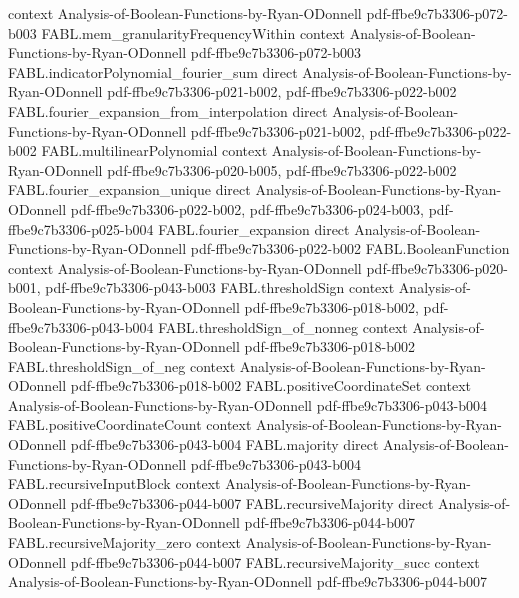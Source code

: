\begin{theorem}
  {context}
  {Analysis-of-Boolean-Functions-by-Ryan-ODonnell}
  {pdf-ffbe9c7b3306-p072-b003}
\proofstep
  {FABL.mem_granularityFrequencyWithin}
  {context}
  {Analysis-of-Boolean-Functions-by-Ryan-ODonnell}
  {pdf-ffbe9c7b3306-p072-b003}
\proofstep
  {FABL.indicatorPolynomial_fourier_sum}
  {direct}
  {Analysis-of-Boolean-Functions-by-Ryan-ODonnell}
  {pdf-ffbe9c7b3306-p021-b002,
    pdf-ffbe9c7b3306-p022-b002}
\proofstep
  {FABL.fourier_expansion_from_interpolation}
  {direct}
  {Analysis-of-Boolean-Functions-by-Ryan-ODonnell}
  {pdf-ffbe9c7b3306-p021-b002,
    pdf-ffbe9c7b3306-p022-b002}
\proofstep
  {FABL.multilinearPolynomial}
  {context}
  {Analysis-of-Boolean-Functions-by-Ryan-ODonnell}
  {pdf-ffbe9c7b3306-p020-b005,
    pdf-ffbe9c7b3306-p022-b002}
\proofstep
  {FABL.fourier_expansion_unique}
  {direct}
  {Analysis-of-Boolean-Functions-by-Ryan-ODonnell}
  {pdf-ffbe9c7b3306-p022-b002,
    pdf-ffbe9c7b3306-p024-b003,
    pdf-ffbe9c7b3306-p025-b004}
\proofstep
  {FABL.fourier_expansion}
  {direct}
  {Analysis-of-Boolean-Functions-by-Ryan-ODonnell}
  {pdf-ffbe9c7b3306-p022-b002}
\proofstep
  {FABL.BooleanFunction}
  {context}
  {Analysis-of-Boolean-Functions-by-Ryan-ODonnell}
  {pdf-ffbe9c7b3306-p020-b001,
    pdf-ffbe9c7b3306-p043-b003}
\proofstep
  {FABL.thresholdSign}
  {context}
  {Analysis-of-Boolean-Functions-by-Ryan-ODonnell}
  {pdf-ffbe9c7b3306-p018-b002,
    pdf-ffbe9c7b3306-p043-b004}
\proofstep
  {FABL.thresholdSign_of_nonneg}
  {context}
  {Analysis-of-Boolean-Functions-by-Ryan-ODonnell}
  {pdf-ffbe9c7b3306-p018-b002}
\proofstep
  {FABL.thresholdSign_of_neg}
  {context}
  {Analysis-of-Boolean-Functions-by-Ryan-ODonnell}
  {pdf-ffbe9c7b3306-p018-b002}
\proofstep
  {FABL.positiveCoordinateSet}
  {context}
  {Analysis-of-Boolean-Functions-by-Ryan-ODonnell}
  {pdf-ffbe9c7b3306-p043-b004}
\proofstep
  {FABL.positiveCoordinateCount}
  {context}
  {Analysis-of-Boolean-Functions-by-Ryan-ODonnell}
  {pdf-ffbe9c7b3306-p043-b004}
\proofstep
  {FABL.majority}
  {direct}
  {Analysis-of-Boolean-Functions-by-Ryan-ODonnell}
  {pdf-ffbe9c7b3306-p043-b004}
\proofstep
  {FABL.recursiveInputBlock}
  {context}
  {Analysis-of-Boolean-Functions-by-Ryan-ODonnell}
  {pdf-ffbe9c7b3306-p044-b007}
\proofstep
  {FABL.recursiveMajority}
  {direct}
  {Analysis-of-Boolean-Functions-by-Ryan-ODonnell}
  {pdf-ffbe9c7b3306-p044-b007}
\proofstep
  {FABL.recursiveMajority_zero}
  {context}
  {Analysis-of-Boolean-Functions-by-Ryan-ODonnell}
  {pdf-ffbe9c7b3306-p044-b007}
\proofstep
  {FABL.recursiveMajority_succ}
  {context}
  {Analysis-of-Boolean-Functions-by-Ryan-ODonnell}
  {pdf-ffbe9c7b3306-p044-b007}

\end{theorem}
